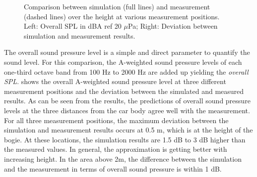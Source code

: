 \begin{figure}
\begin{subfigure}[b]{0.49\textwidth}
	\end{subfigure}
	\caption{Comparison between simulation (full lines) and measurement (dashed lines) over the height at various measurement positions. Left: Overall SPL in dBA ref 20 $\mu$Pa; Right: Deviation between simulation and measurement results.}
	\label{fig:overall_SPL}
\end{figure}
The overall sound pressure level is a simple and direct parameter to quantify the sound level. 
For this comparison, the A-weighted sound pressure levels of each one-third octave band from 100 Hz to 2000 Hz are added up yielding the \emph{overall SPL}. 
 shows the overall A-weighted sound pressure level at three different measurement positions and the deviation between the simulated and measured results. As can be seen from the results, the predictions of overall sound pressure levels at the three distances from the car body agree well with the measurement. For all three measurement positions, the maximum deviation between the simulation and measurement results occurs at 0.5 m, which is at the height of the bogie. At these locations, the simulation results are 1.5 dB to 3 dB higher than the measured values. In general, the approximation is getting better with increasing height. In the area above 2m, the difference between the simulation and the measurement in terms of overall sound pressure is within 1 dB.

